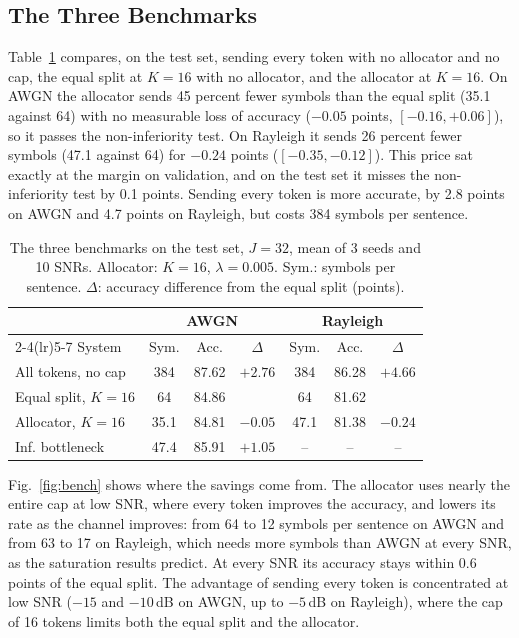 \documentclass[conference]{IEEEtran}
\begin{document}
\subsection{The Three Benchmarks}
\label{ssec:bench}

Table~\ref{tab:bench} compares, on the test set, sending every token
with no allocator and no cap, the equal split at $K{=}16$ with no
allocator, and the allocator at $K{=}16$. On AWGN the allocator sends
45 percent fewer symbols than the equal split (35.1 against 64) with
no measurable loss of accuracy ($-0.05$ points,
$[-0.16, +0.06]$), so it passes the non-inferiority test. On Rayleigh
it sends 26 percent fewer symbols (47.1 against 64) for $-0.24$ points
($[-0.35, -0.12]$). This price sat exactly at the margin on
validation, and on the test set it misses the non-inferiority test by
0.1 points. Sending every token is more accurate, by 2.8 points on
AWGN and 4.7 points on Rayleigh, but costs 384 symbols per sentence.

\begin{table}[!t]
  \centering
  \caption{The three benchmarks on the test set, $J{=}32$, mean of
           3 seeds and 10 SNRs. Allocator: $K{=}16$, $\lambda{=}0.005$.
           Sym.: symbols per sentence. $\Delta$: accuracy difference
           from the equal split (points).}
  \label{tab:bench}
  \footnotesize
  \setlength{\tabcolsep}{3.5pt}
  \begin{tabular}{lcccccc}
    \toprule
    & \multicolumn{3}{c}{AWGN} & \multicolumn{3}{c}{Rayleigh} \\
    \cmidrule(lr){2-4}\cmidrule(lr){5-7}
    System & Sym. & Acc. & $\Delta$ & Sym. & Acc. & $\Delta$ \\
    \midrule
    All tokens, no cap     & 384  & 87.62 & $+2.76$ & 384  & 86.28 & $+4.66$ \\
    Equal split, $K{=}16$  & 64   & 84.86 &         & 64   & 81.62 & \\
    Allocator, $K{=}16$    & 35.1 & 84.81 & $-0.05$ & 47.1 & 81.38 & $-0.24$ \\
    Inf. bottleneck \cite{shao2022learning} & 47.4 & 85.91 & $+1.05$ & -- & -- & -- \\
    \bottomrule
  \end{tabular}
\end{table}

Fig.~\ref{fig:bench} shows where the savings come from. The allocator
uses nearly the entire cap at low SNR, where every token improves the accuracy, and
lowers its rate as the channel improves: from 64 to 12 symbols per
sentence on AWGN and from 63 to 17 on Rayleigh, which needs more
symbols than AWGN at every SNR, as the saturation results predict. At
every SNR its accuracy stays within 0.6 points of the equal split. The
advantage of sending every token is concentrated at low SNR ($-15$ and
$-10$\,dB on AWGN, up to $-5$\,dB on Rayleigh), where the cap of 16
tokens limits both the equal split and the allocator.
\end{document}
